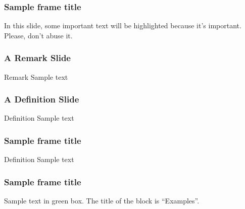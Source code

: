

\begin{frame}
\frametitle{Sample frame title}

In this slide, some important text will be \alert{highlighted} because it's important. Please, don't abuse it.

\end{frame}
\begin{frame}
\frametitle{A Remark Slide}

  \begin{block}{Remark}
    Sample text
  \end{block}

\end{frame}
\begin{frame}
\frametitle{A Definition Slide}

  \begin{alertblock}{Definition}
    Sample text
  \end{alertblock}

\end{frame}
\begin{frame}
\frametitle{Sample frame title}

  \begin{alertblock}{Definition}
    Sample text
  \end{alertblock}

\end{frame}
\begin{frame}
\frametitle{Sample frame title}

  \begin{examples}
    Sample text in green box. The title of the block is ``Examples''.
  \end{examples}

\end{frame}
